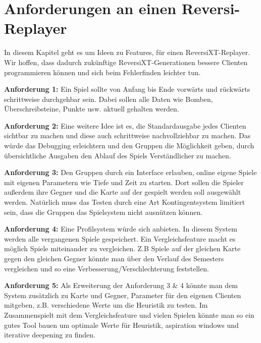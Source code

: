 \documentclass[12pt,a4paper,bibliography=totocnumbered,listof=totocnumbered]{scrartcl}
\begin{document}
	\section{Anforderungen an einen Reversi-Replayer}
	\vspace{1em}
	
	In diesem Kapitel geht es um Ideen zu Features, für einen ReversiXT-Replayer. Wir hoffen, dass dadurch zukünftige ReversiXT-Generationen bessere Clienten programmieren können und sich beim Fehlerfinden leichter tun.
	
	\textbf{Anforderung 1:} Ein Spiel sollte von Anfang bis Ende vorwärts und rückwärts schrittweise durchgehbar sein. Dabei sollen alle Daten wie Bomben, Überschreibsteine, Punkte usw. aktuell gehalten werden.
	
	\textbf{Anforderung 2:} Eine weitere Idee ist es, die Standardausgabe jedes Clienten sichtbar zu machen und diese auch schrittweise nachvollziehbar zu machen. Das würde das Debugging erleichtern und den Gruppen die Möglichkeit geben, durch übersichtliche Ausgaben den Ablauf des Spiels Verständlicher zu machen.
	
	\textbf{Anforderung 3:} Den Gruppen durch ein Interface erlauben, online eigene Spiele mit eigenen Parametern wie Tiefe und Zeit zu starten. Dort sollen die Spieler außerdem ihre Gegner und die Karte auf der gespielt werden soll ausgewählt werden. Natürlich muss das Testen durch eine Art Kontingentsystem limitiert sein, dass die Gruppen das Spielsystem nicht ausnützen können. 
	
	\textbf{Anforderung 4:} Eine Profilsystem würde sich anbieten. In diesem System werden alle vergangenen Spiele gespeichert. Ein Vergleichsfeature macht es möglich Spiele miteinander zu vergleichen. Z.B Spiele auf der gleichen Karte gegen den gleichen Gegner könnte man über den Verlauf des Semesters vergleichen und so eine Verbesserung/Verschlechterung feststellen.
	
	\textbf{Anforderung 5:} Als Erweiterung der Anforderung 3 \& 4 könnte man dem System zusätzlich zu Karte und Gegner, Parameter für den eigenen Clienten mitgeben, z.B. verschiedene Werte um die Heuristik zu testen. Im Zusammenspielt mit dem Vergleichsfeature und vielen Spielen könnte man so ein gutes Tool bauen um optimale Werte für Heuristik, aspiration windows und iterative deepening zu finden.
	
\end{document}
